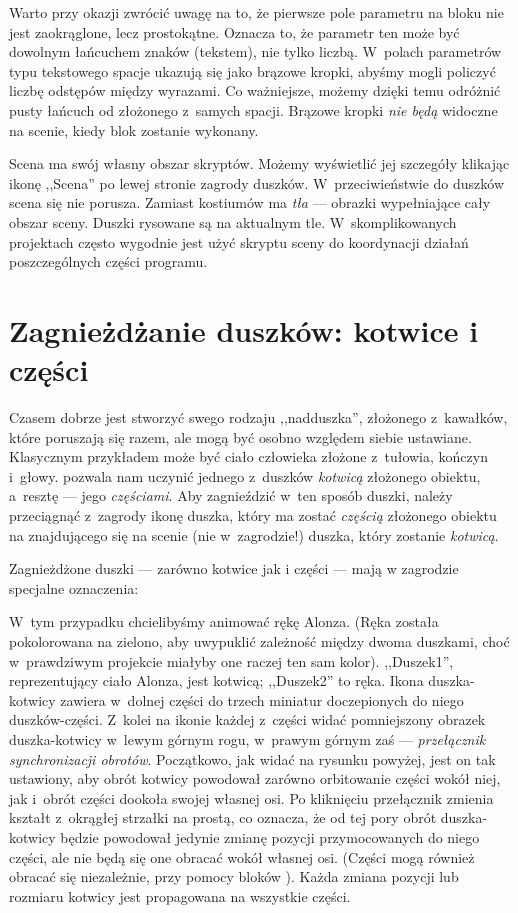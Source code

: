 \documentclass{report}
\begin{document}
Warto przy okazji zwrócić uwagę na to, że pierwsze pole parametru na bloku  nie jest zaokrąglone, lecz prostokątne. Oznacza to, że parametr ten może być dowolnym łańcuchem znaków (tekstem), nie tylko liczbą. W~polach parametrów typu tekstowego spacje ukazują się jako brązowe kropki, abyśmy mogli policzyć liczbę odstępów między wyrazami. Co ważniejsze, możemy dzięki temu odróżnić pusty łańcuch od złożonego z~samych spacji. Brązowe kropki \emph{nie będą} widoczne na scenie, kiedy blok zostanie wykonany.

Scena ma swój własny obszar skryptów. Możemy wyświetlić jej szczegóły klikając ikonę ,,Scena'' po lewej stronie zagrody duszków. W~przeciwieństwie do duszków scena się nie porusza. Zamiast kostiumów ma \emph{tła} --- obrazki wypełniające cały obszar sceny. Duszki rysowane są na aktualnym tle. W~skomplikowanych projektach często wygodnie jest użyć skryptu sceny do koordynacji działań poszczególnych części programu.

\section{Zagnieżdżanie duszków: kotwice i części}
\label{sec:zagnieżdżanie-duszków}

Czasem dobrze jest stworzyć swego rodzaju ,,nadduszka'', złożonego z~kawałków, które poruszają się razem, ale mogą być osobno względem siebie ustawiane. Klasycznym przykładem może być ciało człowieka złożone z~tułowia, kończyn i~głowy. \Snap{} pozwala nam uczynić jednego z~duszków \emph{kotwicą} złożonego obiektu, a~resztę --- jego \emph{częściami}. Aby zagnieździć w~ten sposób duszki, należy przeciągnąć z~zagrody ikonę duszka, który ma zostać \emph{częścią} złożonego obiektu na znajdującego się na scenie (nie w~zagrodzie!) duszka, który zostanie \emph{kotwicą}.

Zagnieżdżone duszki --- zarówno kotwice jak i części --- mają w zagrodzie specjalne oznaczenia:


W~tym przypadku chcielibyśmy animować rękę Alonza. (Ręka została pokolorowana na zielono, aby uwypuklić zależność między dwoma duszkami, choć w~prawdziwym projekcie miałyby one raczej ten sam kolor). ,,Duszek1'', reprezentujący ciało Alonza, jest kotwicą; ,,Duszek2'' to ręka. Ikona duszka-kotwicy zawiera w~dolnej części do trzech miniatur doczepionych do niego duszków-części. Z~kolei na ikonie każdej z~części widać pomniejszony obrazek duszka-kotwicy w~lewym górnym rogu, w~prawym górnym zaś --- \emph{przełącznik synchronizacji obrotów}. Początkowo, jak widać na rysunku powyżej, jest on tak ustawiony, aby obrót kotwicy powodował zarówno orbitowanie części wokół niej, jak i~obrót części dookoła swojej własnej osi. Po kliknięciu przełącznik zmienia kształt z~okrągłej strzałki na prostą, co oznacza, że od tej pory obrót duszka-kotwicy będzie powodował jedynie zmianę pozycji przymocowanych do niego części, ale nie będą się one obracać wokół własnej osi. (Części mogą również obracać się niezależnie, przy pomocy bloków ). Każda zmiana pozycji lub rozmiaru kotwicy jest propagowana na wszystkie części.
\end{document}
